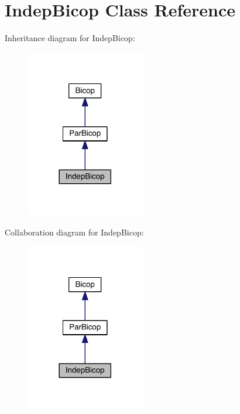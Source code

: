 \hypertarget{class_indep_bicop}{}\section{Indep\+Bicop Class Reference}
\label{class_indep_bicop}


Inheritance diagram for Indep\+Bicop\+:
\nopagebreak
\begin{figure}[H]
\begin{center}
\leavevmode
\includegraphics[width=146pt]{class_indep_bicop__inherit__graph}
\end{center}
\end{figure}


Collaboration diagram for Indep\+Bicop\+:
\nopagebreak
\begin{figure}[H]
\begin{center}
\leavevmode
\includegraphics[width=146pt]{class_indep_bicop__coll__graph}
\end{center}
\end{figure}
